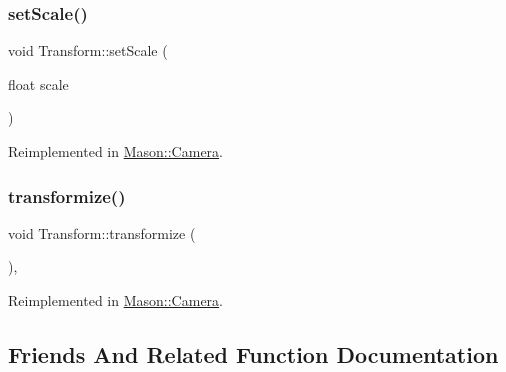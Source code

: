 \hypertarget{class_mason_1_1_transform_a498d685b66e2f73b88d3583ce55461c8}{}\label{class_mason_1_1_transform_a498d685b66e2f73b88d3583ce55461c8} 
\subsubsection{\texorpdfstring{set\+Scale()}{setScale()}}
{\footnotesize\ttfamily void Transform\+::set\+Scale (\begin{DoxyParamCaption}\item[{float}]{scale }\end{DoxyParamCaption})\hspace{0.3cm}{\ttfamily [virtual]}}



Reimplemented in \hyperlink{class_mason_1_1_camera_af7aa6752699108d282996199549a704b}{Mason\+::\+Camera}.

\hypertarget{class_mason_1_1_transform_a4dd61568d49044377f3312397ffdafd1}{}\label{class_mason_1_1_transform_a4dd61568d49044377f3312397ffdafd1} 
\subsubsection{\texorpdfstring{transformize()}{transformize()}}
{\footnotesize\ttfamily void Transform\+::transformize (\begin{DoxyParamCaption}{ }\end{DoxyParamCaption})\hspace{0.3cm}{\ttfamily [protected]}, {\ttfamily [virtual]}}



Reimplemented in \hyperlink{class_mason_1_1_camera_a27ff2d3ad004a49db2ae508ac6e9d3c2}{Mason\+::\+Camera}.



\subsection{Friends And Related Function Documentation}
\hypertarget{class_mason_1_1_transform_a00df87c957d8f7ee0fc51f07a0542f4a}{}\label{class_mason_1_1_transform_a00df87c957d8f7ee0fc51f07a0542f4a} 
